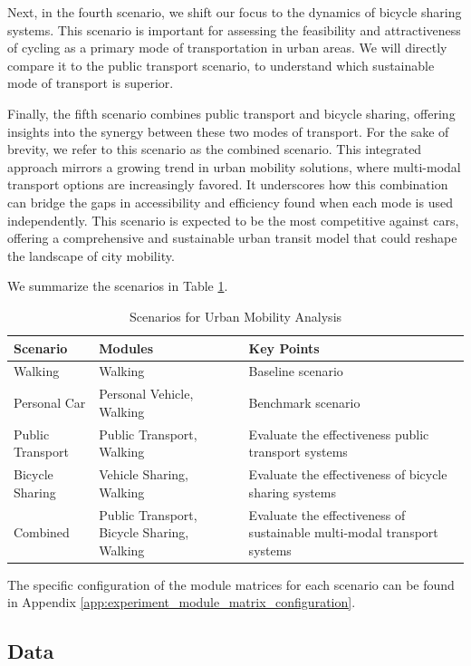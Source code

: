 Next, in the fourth scenario, we shift our focus to the dynamics of bicycle sharing systems. 
This scenario is important for assessing the feasibility and attractiveness of cycling as a primary mode of transportation in urban areas. 
We will directly compare it to the public transport scenario, to understand which sustainable mode of transport is superior.

Finally, the fifth scenario combines public transport and bicycle sharing, offering insights into the synergy between these two modes of transport.
For the sake of brevity, we refer to this scenario as the combined scenario.
This integrated approach mirrors a growing trend in urban mobility solutions, where multi-modal transport options are increasingly favored. 
It underscores how this combination can bridge the gaps in accessibility and efficiency found when each mode is used independently. 
This scenario is expected to be the most competitive against cars, offering a comprehensive and sustainable urban transit model that could reshape the landscape of city mobility.

We summarize the scenarios in Table \ref{table:scenarios}.

\begin{table}[h]
\centering
\begin{tabular}{|p{4cm}|p{5cm}|p{4cm}|}
\hline
\textbf{Scenario} & \textbf{Modules} & \textbf{Key Points} \\
\hline
Walking & Walking & Baseline scenario \\
\hline
Personal Car & Personal Vehicle, Walking & Benchmark scenario \\
\hline
Public Transport & Public Transport, Walking & Evaluate the effectiveness public transport systems \\
\hline
Bicycle Sharing & Vehicle Sharing, Walking & Evaluate the effectiveness of bicycle sharing systems \\
\hline
Combined & Public Transport, Bicycle Sharing, Walking & Evaluate the effectiveness of sustainable multi-modal transport systems \\
\hline
\end{tabular}
\caption{Scenarios for Urban Mobility Analysis}
\label{table:scenarios}
\end{table}

The specific configuration of the module matrices for each scenario can be found in Appendix \ref{app:experiment_module_matrix_configuration}.

\subsection{Data}
\label{subs:data}

